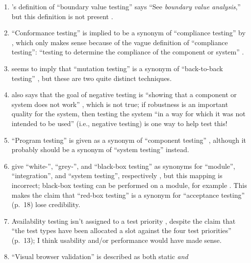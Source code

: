 \begin{enumerate}
      \item \citeauthor{Kam2008}'s definition of ``boundary value testing''
            says ``See \emph{boundary value analysis},'' but this definition is
            not present \citeyearpar{Kam2008}.
      \item ``Conformance testing'' is implied to be a synonym of ``compliance
            testing'' by \citeauthor{Kam2008}, which only makes sense because
            of the vague definition of ``compliance testing'': ``testing to
            determine the compliance of the component or system''
            \citeyearpar[p.~43]{Kam2008}.
      \item \citeauthor{Kam2008} seems to imply that ``mutation testing'' is a
            synonym of ``back-to-back testing'' \citeyearpar[p.~46]{Kam2008},
            but these are two quite distinct techniques.
      \item \citeauthor{Kam2008} also says that the goal of negative testing is
            ``showing that a component or system does not work''
            \citeyearpar[p.~46]{Kam2008} , which is not true;
            if robustness is an important quality for the system, then testing
            the system ``in a way for which it was not intended to be used''
            \citepISTQB{} (i.e., negative testing) is one way to help
            test this!
      \item ``Program testing'' is given as a synonym of ``component testing''
            \citep[p.~46]{Kam2008}, although it probably should be a synonym of
            ``system testing'' instead.
      \item \citeauthor{SneedAndGöschl2000} give ``white-'', ``grey-'', and
            ``black-box testing'' as synonyms for ``module'', ``integration'',
            and ``system testing'', respectively
            \citeyearpar[p.~18]{SneedAndGöschl2000} , but
            this mapping is incorrect; black-box testing can be performed on a
            module, for example . This makes the claim that
            ``red-box testing'' is a synonym for ``acceptance testing'' (p.~18)
            lose credibility.
      \item Availability testing isn't assigned to a test priority
            \citep[Tab.~2]{Gerrard2000a}, despite the claim that ``the test
            types have been allocated a slot against
            the four test priorities'' (p.~13); I think usability and/or
            performance would have made sense.
      \item ``Visual browser validation'' is described as both static \emph{and}

\end{enumerate}
